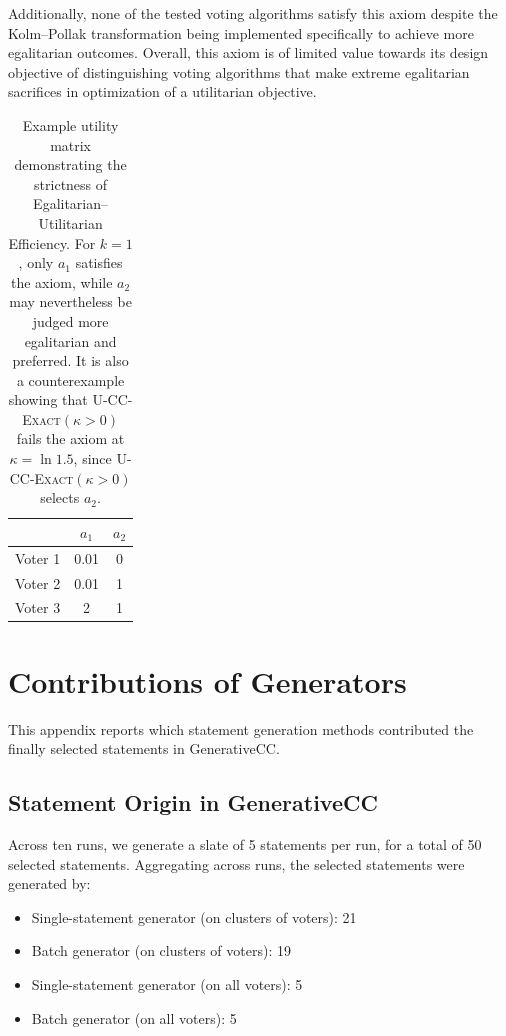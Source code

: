 \documentclass[letterpaper]{article} %
\newcommand{\ExactP}{\textsc{U-CC-Exact}$(\kappa>0)$}
\begin{document}
Additionally, none of the tested voting algorithms satisfy this axiom despite the Kolm--Pollak transformation being implemented specifically to achieve more egalitarian outcomes.
Overall, this axiom is of limited value towards its design objective of distinguishing voting algorithms that make extreme egalitarian sacrifices in optimization of a utilitarian objective.

\begin{table}[t]
\centering
\begin{tabular}{l|cc}
\hline
 & $a_1$ & $a_2$ \\
\hline
Voter 1 & 0.01 & 0 \\
Voter 2 & 0.01 & 1 \\
Voter 3 & 2 & 1 \\
\hline
\end{tabular}
\caption{Example utility matrix demonstrating the strictness of Egalitarian--Utilitarian Efficiency.
For \(k=1\), only \(a_1\) satisfies the axiom, while \(a_2\) may nevertheless be judged more egalitarian and preferred.
It is also a counterexample showing that \ExactP{} fails the axiom at \(\kappa=\ln 1.5\), since \ExactP{} selects \(a_2\).}
\label{tab:egal-util-strict}
\end{table}

\section{Contributions of Generators}
\label{app:statement-origin}

This appendix reports which statement generation methods contributed the finally selected statements in GenerativeCC.

\subsection{Statement Origin in GenerativeCC}

Across ten runs, we generate a slate of 5 statements per run, for a total of 50 selected statements.
Aggregating across runs, the selected statements were generated by:
\begin{itemize}
    \item Single-statement generator (on clusters of voters): 21
    \item Batch generator (on clusters of voters): 19
    \item Single-statement generator (on all voters): 5
    \item Batch generator (on all voters): 5
\end{itemize}
\end{document}
